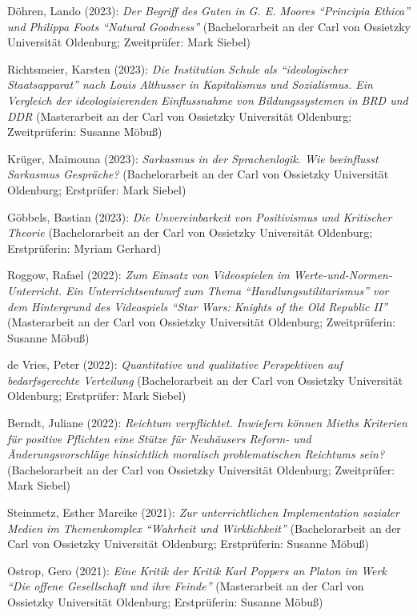 \documentclass[a4paper,10pt]{article}
\newenvironment{literature}{%
   \parskip6pt\parindent0pt\raggedright
   \def\lititem{\hangindent=1cm\hangafter1}}{%
   \par\ignorespaces}
\begin{document}
\begin{literature}
\lititem Döhren, Lando (2023): \textit{Der Begriff des Guten in G. E. Moores \enquote{Principia Ethica} und Philippa Foots \enquote{Natural Goodness}} (Bachelorarbeit an der Carl von Ossietzky Universität Oldenburg; Zweitprüfer: Mark Siebel)

\lititem Richtsmeier, Karsten (2023): \textit{Die Institution Schule als \enquote{ideologischer Staatsapparat} nach Louis Althusser in Kapitalismus und Sozialismus. Ein Vergleich der ideologisierenden Einflussnahme von Bildungssystemen in BRD und DDR} (Masterarbeit an der Carl von Ossietzky Universität Oldenburg; Zweitprüferin: Susanne Möbuß)

\lititem Krüger, Maimouna (2023): \textit{Sarkasmus in der Sprachenlogik. Wie beeinflusst Sarkasmus Gespräche?} (Bachelorarbeit an der Carl von Ossietzky Universität Oldenburg; Erstprüfer: Mark Siebel)

\lititem Göbbels, Bastian (2023): \textit{Die Unvereinbarkeit von Positivismus und Kritischer Theorie} (Bachelorarbeit an der Carl von Ossietzky Universität Oldenburg; Erstprüferin: Myriam Gerhard)

\lititem Roggow, Rafael (2022): \textit{Zum Einsatz von Videospielen im Werte-und-Normen-Unterricht. Ein Unterrichtsentwurf zum Thema \enquote{Handlungsutilitarismus} vor dem Hintergrund des Videospiels \enquote{Star Wars: Knights of the Old Republic II}} (Masterarbeit an der Carl von Ossietzky Universität Oldenburg; Zweitprüferin: Susanne Möbuß)

\lititem de Vries, Peter (2022): \textit{Quantitative und qualitative Perspektiven auf bedarfsgerechte Verteilung} (Bachelorarbeit an der Carl von Ossietzky Universität Oldenburg; Erstprüfer: Mark Siebel)

\lititem Berndt, Juliane (2022): \textit{Reichtum verpflichtet. Inwiefern können Mieths Kriterien für positive Pflichten eine Stütze für Neuhäusers Reform- und Änderungsvorschläge hinsichtlich moralisch problematischen Reichtums sein?} (Bachelorarbeit an der Carl von Ossietzky Universität Oldenburg; Zweitprüfer: Mark Siebel)

\lititem Steinmetz, Esther Mareike (2021): \textit{Zur unterrichtlichen Implementation sozialer Medien im Themenkomplex \enquote{Wahrheit und Wirklichkeit}} (Bachelorarbeit an der Carl von Ossietzky Universität Oldenburg; Erstprüferin: Susanne Möbuß)

\lititem Ostrop, Gero (2021): \textit{Eine Kritik der Kritik Karl Poppers an Platon im Werk \enquote{Die offene Gesellschaft und ihre Feinde}} (Masterarbeit an der Carl von Ossietzky Universität Oldenburg; Erstprüferin: Susanne Möbuß)


\end{literature}
\end{document}
